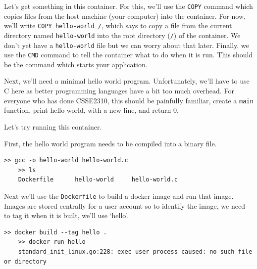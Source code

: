 Let's get something in this container.
For this, we'll use the \texttt{COPY} command which copies files from the host machine (your computer) into the container.
For now, we'll write \texttt{COPY hello-world /}, which says to copy a file from the current directory named \texttt{hello-world} into the root directory (\texttt{/})
of the container.
We don't yet have a \texttt{hello-world} file but we can worry about that later.
Finally, we use the \texttt{CMD} command to tell the container what to do when it is run.
This should be the command which starts your application.

\begin{shaded*}

\end{shaded*}


Next, we'll need a minimal hello world program.
Unfortunately, we'll have to use C here as better programming languages have a bit too much overhead.
For everyone who has done CSSE2310, this should be painfully familiar, create a \texttt{main} function, print hello world, with a new line, and return 0.

\begin{shaded*}

\end{shaded*}

Let's try running this container.

First, the hello world program needs to be compiled into a binary file.

\begin{shaded*}
\begin{lstlisting}[language=shell]
    >> gcc -o hello-world hello-world.c
    >> ls
    Dockerfile      hello-world     hello-world.c
\end{lstlisting}
\end{shaded*}

Next we'll use the \texttt{Dockerfile} to build a docker image and run that image.
Images are stored centrally for a user account so to identify the image, we need to tag it when it is built, we'll use `hello'.

\begin{shaded*}
\begin{lstlisting}[language=shell]
    >> docker build --tag hello .
    >> docker run hello
    standard_init_linux.go:228: exec user process caused: no such file or directory
\end{lstlisting}
\end{shaded*}

